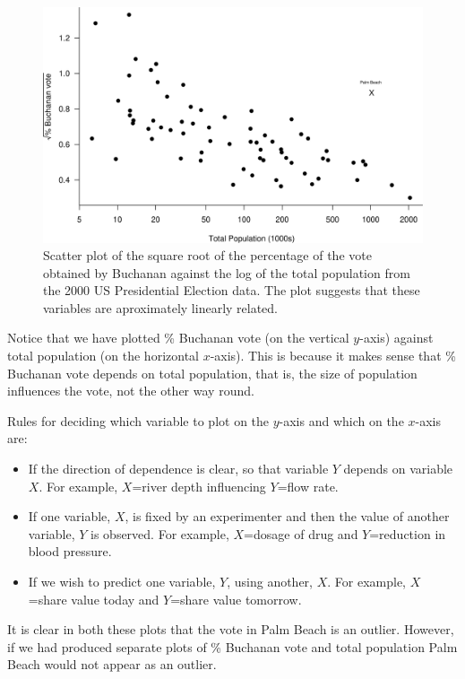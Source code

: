 \documentclass[
  11pt,
  british,
  openany, a4paper]{book}
\providecommand{\tightlist}{%
  \setlength{\itemsep}{0pt}\setlength{\parskip}{0pt}}
\begin{document}
\begin{figure}

{\centering \includegraphics[width=0.75\linewidth]{images/election_scatter1b} 

}

\caption{Scatter plot of the square root of the percentage of the vote obtained by Buchanan against the log of the total population from the 2000 US Presidential Election data.  The plot suggests that these variables are aproximately linearly related.}\label{fig:scatter1b}
\end{figure}

Notice that we have plotted \% Buchanan vote (on the vertical \(y\)-axis) against total population (on the horizontal \(x\)-axis). This is because it makes sense that \% Buchanan vote depends on total population, that is, the size of population influences the vote, not the other way round.

Rules for deciding which variable to plot on the \(y\)-axis and which on the \(x\)-axis are:

\begin{itemize}
\tightlist
\item
  If the direction of dependence is clear, so that variable \(Y\) depends on variable \(X\). For example, \(X\)=river depth influencing \(Y\)=flow rate.
\item
  If one variable, \(X\), is fixed by an experimenter and then the value of another variable, \(Y\) is observed. For example, \(X\)=dosage of drug and \(Y\)=reduction in blood pressure.
\item
  If we wish to predict one variable, \(Y\), using another, \(X\). For example,
  \(X\)=share value today and \(Y\)=share value tomorrow.
\end{itemize}

It is clear in both these plots that the vote in Palm Beach is an outlier.
However, if we had produced separate plots of \% Buchanan vote and total
population Palm Beach would not appear as an outlier.
\end{document}
